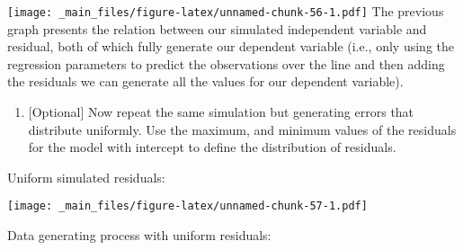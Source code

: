 \documentclass[
]{book}
\newenvironment{Shaded}{\begin{snugshade}}{\end{snugshade}}
\newcommand{\AttributeTok}[1]{\textcolor[rgb]{0.13,0.29,0.53}{#1}}
\newcommand{\DecValTok}[1]{\textcolor[rgb]{0.00,0.00,0.81}{#1}}
\newcommand{\FunctionTok}[1]{\textcolor[rgb]{0.13,0.29,0.53}{\textbf{#1}}}
\newcommand{\NormalTok}[1]{#1}
\newcommand{\OtherTok}[1]{\textcolor[rgb]{0.56,0.35,0.01}{#1}}
\newcommand{\SpecialCharTok}[1]{\textcolor[rgb]{0.81,0.36,0.00}{\textbf{#1}}}
\newcommand{\StringTok}[1]{\textcolor[rgb]{0.31,0.60,0.02}{#1}}
\providecommand{\tightlist}{%
  \setlength{\itemsep}{0pt}\setlength{\parskip}{0pt}}
\begin{document}
\texttt{[image: \_main\_files/figure-latex/unnamed-chunk-56-1.pdf]}
The previous graph presents the relation between our simulated independent variable and residual, both of which fully generate our dependent variable (i.e., only using the regression parameters to predict the observations over the line and then adding the residuals we can generate all the values for our dependent variable).

\begin{enumerate}
\def\labelenumi{\roman{enumi}.}
\setcounter{enumi}{6}
\tightlist
\item
  {[}Optional{]} Now repeat the same simulation but generating errors that distribute uniformly. Use the maximum, and minimum values of the residuals for the model with intercept to define the distribution of residuals.
\end{enumerate}

Uniform simulated residuals:

\begin{Shaded}
\end{Shaded}

\texttt{[image: \_main\_files/figure-latex/unnamed-chunk-57-1.pdf]}

Data generating process with uniform residuals:
\end{document}
